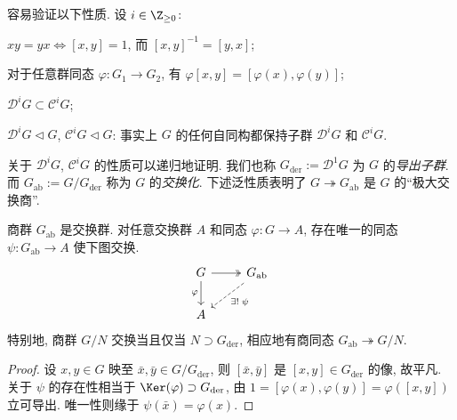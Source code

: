 容易验证以下性质. 设 $i \in \Z_{\geq 0}$:
\begin{compactitem}
	\item $xy=yx \iff [x,y]=1$, 而 $[x,y]^{-1} = [y,x]$;
	\item 对于任意群同态 $\varphi: G_1 \to G_2$, 有 $\varphi [x,y] = [\varphi(x), \varphi(y)]$;
	\item $\mathscr{D}^i G \subset \mathscr{C}^i G$;
	\item $\mathscr{D}^i G \lhd G$, $\mathscr{C}^i G \lhd G$: 事实上 $G$ 的任何自同构都保持子群 $\mathscr{D}^i G$ 和 $\mathscr{C}^i G$.
\end{compactitem}
关于 $\mathscr{D}^i G$, $\mathscr{C}^i G$ 的性质可以递归地证明. 我们也称 $G_\text{der} := \mathscr{D}^1 G$ 为 $G$ 的\emph{导出子群}. 而 $G_\text{ab} := G/G_\text{der}$ 称为 $G$ 的\emph{交换化}. 下述泛性质表明了 $G \twoheadrightarrow G_\text{ab}$ 是 $G$ 的``极大交换商''.  

\begin{lemma}\label{prop:abelianization}
	商群 $G_{\mathrm{ab}}$ 是交换群. 对任意交换群 $A$ 和同态 $\varphi: G \to A$, 存在唯一的同态 $\psi: G_{\mathrm{ab}} \to A$ 使下图交换.
	\[ \begin{tikzcd}
		G \arrow[twoheadrightarrow, r] \arrow[d, "\varphi"'] & G_{\mathrm{ab}} \arrow[dashed, ld, "{\exists ! \; \psi}"] \\
		A &
	\end{tikzcd} \]
	特别地, 商群 $G/N$ 交换当且仅当 $N \supset G_\text{der}$, 相应地有商同态 $G_{\mathrm{ab}} \twoheadrightarrow G/N$.
\end{lemma}
\begin{proof}
	设 $x,y \in G$ 映至 $\bar{x}, \bar{y} \in G/G_\text{der}$, 则 $[\bar{x}, \bar{y}]$ 是 $[x,y] \in G_\text{der}$ 的像, 故平凡. 关于 $\psi$ 的存在性相当于 $\Ker(\varphi) \supset G_\text{der}$, 由 $1 = [\varphi(x), \varphi(y)] = \varphi([x,y])$ 立可导出. 唯一性则缘于  $\psi(\bar{x}) = \varphi(x)$.
\end{proof}

